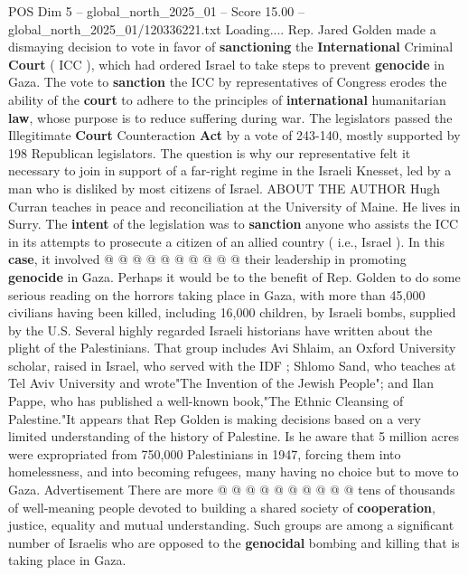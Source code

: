 \begin{textsample}{POS Dim 5 – global\_north\_2025\_01 – Score 15.00 – global\_north\_2025\_01/120336221.txt}  \label{ex:f5_pos_383}
Loading....
Rep.
Jared Golden made a dismaying decision to vote in favor of \textbf{sanctioning} the \textbf{International} Criminal \textbf{Court} ( ICC ), which had ordered Israel to take steps to prevent \textbf{genocide} in Gaza.
The vote to \textbf{sanction} the ICC by representatives of Congress erodes the ability of the \textbf{court} to adhere to the principles of \textbf{international} humanitarian \textbf{law}, whose purpose is to reduce suffering during war.
The legislators passed the Illegitimate \textbf{Court} Counteraction \textbf{Act} by a vote of 243-140, mostly supported by 198 Republican legislators.
The question is why our representative felt it necessary to join in support of a far-right regime in the Israeli Knesset, led by a man who is disliked by most citizens of Israel.
ABOUT THE AUTHOR Hugh Curran teaches in peace and reconciliation at the University of Maine.
He lives in Surry.
The \textbf{intent} of the legislation was to \textbf{sanction} anyone who assists the ICC in its attempts to prosecute a citizen of an allied country ( i.e., Israel ).
In this \textbf{case}, it involved @ @ @ @ @ @ @ @ @ @ their leadership in promoting \textbf{genocide} in Gaza.
Perhaps it would be to the benefit of Rep.
Golden to do some serious reading on the horrors taking place in Gaza, with more than 45,000 civilians having been killed, including 16,000 children, by Israeli bombs, supplied by the U.S.
Several highly regarded Israeli historians have written about the plight of the Palestinians.
That group includes Avi Shlaim, an Oxford University scholar, raised in Israel, who served with the IDF ; Shlomo Sand, who teaches at Tel Aviv University and wrote"The Invention of the Jewish People"; and Ilan Pappe, who has published a well-known book,"The Ethnic Cleansing of Palestine."It appears that Rep Golden is making decisions based on a very limited understanding of the history of Palestine.
Is he aware that 5 million acres were expropriated from 750,000 Palestinians in 1947, forcing them into homelessness, and into becoming refugees, many having no choice but to move to Gaza.
Advertisement There are more @ @ @ @ @ @ @ @ @ @ tens of thousands of well-meaning people devoted to building a shared society of \textbf{cooperation}, justice, equality and mutual understanding.
Such groups are among a significant number of Israelis who are opposed to the \textbf{genocidal} bombing and killing that is taking place in Gaza.

\end{textsample}
